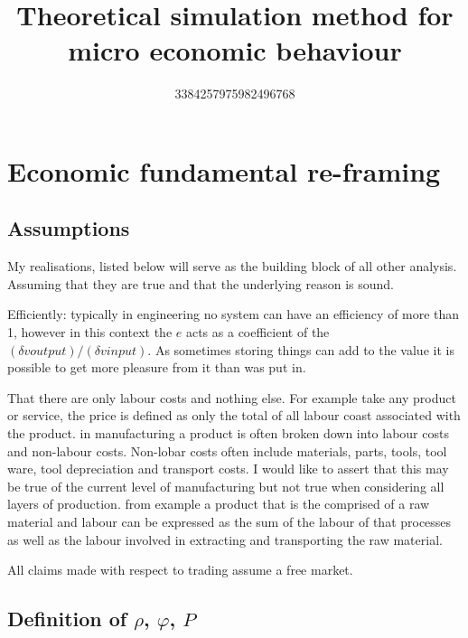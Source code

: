 \documentclass[]{article}
\title{Theoretical simulation method for micro economic behaviour}
\author{3384257975982496768}
\begin{document}
\maketitle
\newpage



\section{Economic fundamental re-framing}

\subsection{Assumptions}

My realisations, listed below will serve as the building block of all other analysis. Assuming that they are true and that the underlying reason is sound. 

Efficiently: typically in engineering no system can have an efficiency of more than 1, however in this context the $e$ acts as a coefficient of the $(\delta v output) / ( \delta v input)$. As sometimes storing things can add to the value it is possible to get more pleasure from it than was put in.

That there are only labour costs and nothing else. For example take any product or service, the price is defined as only the total of all labour coast associated with the product. in manufacturing a product is often broken down into labour costs and non-labour costs. Non-lobar costs often include materials, parts, tools, tool ware, tool depreciation and transport costs. I would like to assert that this may be true of the current level of manufacturing but not true when considering all layers of production. from example a product that is the comprised of a raw material and labour can be expressed as the sum of the labour of that processes as well as the labour involved in extracting and transporting the raw material. 

All claims made with respect to trading assume a free market.

\subsection{Definition of $\rho$, $\varphi$, $P$}
\end{document}
